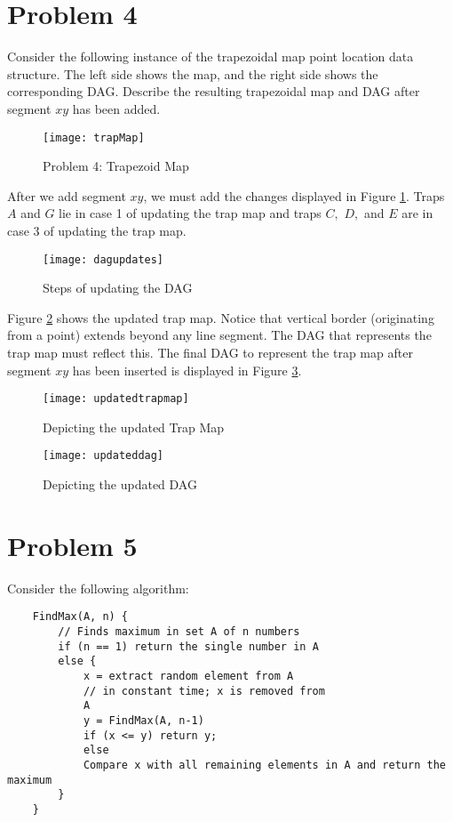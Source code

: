 \documentclass[11pt]{article}
\begin{document}
\newpage
\section*{Problem 4}

Consider the following instance of the trapezoidal map point location data
structure. The left side shows the map, and the right side shows the
corresponding DAG. Describe the resulting trapezoidal map and DAG after segment
$xy$ has been added.

\begin{figure}[h]
    \centering
    \texttt{[image: trapMap]}
    \caption{Problem 4: Trapezoid Map}
\end{figure}
\answer
After we add segment $xy$, we must add the changes displayed in Figure \ref{fig:dagupdates}.
Traps $A$ and $G$ lie in case 1 of updating the trap map and traps $C,$ $D,$ and $E$ are in case 3 of updating the trap map.

\begin{figure}[h]
    \centering
    \texttt{[image: dagupdates]}
    \caption{Steps of updating the DAG}
    \label{fig:dagupdates}
\end{figure}

\newpage
Figure \ref{fig:updatedtrapmap} shows the updated trap map.
Notice that vertical border (originating from a point) extends beyond any line segment.
The DAG that represents the trap map must reflect this.
The final DAG to represent the trap map after segment $xy$ has been inserted is displayed in Figure \ref{fig:updateddag}.

\begin{figure}[h]
    \centering
    \texttt{[image: updatedtrapmap]}
    \caption{Depicting the updated Trap Map}
    \label{fig:updatedtrapmap}
\end{figure}

\begin{figure}[h]
    \centering
    \texttt{[image: updateddag]}
    \caption{Depicting the updated DAG}
    \label{fig:updateddag}
\end{figure}

\newpage
\section*{Problem 5}

Consider the following algorithm:

\begin{verbatim}
    FindMax(A, n) {
        // Finds maximum in set A of n numbers
        if (n == 1) return the single number in A
        else {
            x = extract random element from A
            // in constant time; x is removed from
            A
            y = FindMax(A, n-1)
            if (x <= y) return y;
            else
            Compare x with all remaining elements in A and return the maximum
        }
    }
\end{verbatim}
\end{document}
